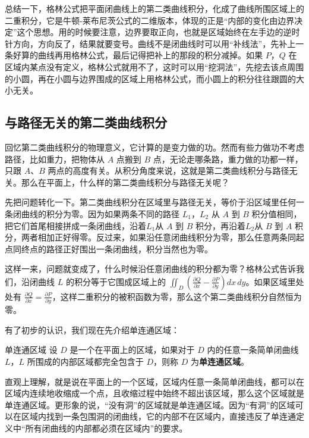 总结一下，格林公式把平面闭曲线上的第二类曲线积分，化成了曲线所围区域上的二重积分，它是牛顿-莱布尼茨公式的二维版本，体现的正是“内部的变化由边界决定”这个思想。用的时候要注意，边界要取正向，也就是区域始终在左手边的逆时针方向，方向反了，结果就要变号。曲线不是闭曲线时可以用“补线法”，先补上一条好算的曲线再用格林公式，最后记得把补上的那段的积分减掉。如果 \(P\)，\(Q\) 在区域内某点没有定义，格林公式就用不了，这时可以用“挖洞法”，先挖去该点周围的小圆，再在小圆与边界围成的区域上用格林公式，而小圆上的积分往往跟圆的大小无关。


\subsection{与路径无关的第二类曲线积分}

回忆第二类曲线积分的物理意义，它计算的是变力做的功。然而有些力做功不考虑路径，比如重力，把物体从 \(A\) 点搬到 \(B\) 点，无论走哪条路，重力做的功都一样，只跟 \(A\)、\(B\) 两点的高度有关。从积分角度来说，这就是第二类曲线积分与路径无关。那么在平面上，什么样的第二类曲线积分与路径无关呢？

先把问题转化一下。第二类曲线积分在区域里与路径无关，等价于沿区域里任何一条闭曲线的积分为零。因为如果两条不同的路径 \(L_1\)，\(L_2\) 从 \(A\) 到 \(B\) 积分值相同，把它们首尾相接拼成一条闭曲线，沿着\(L_1\)从 \(A\) 到 \(B\) 积分，再沿着\(L_2\)从 \(B\) 到 \(A\) 积分，两者相加正好得零。反过来，如果沿任意闭曲线积分为零，那么任意两条同起点同终点的路径正好围出一条闭曲线，积分当然也为零。

这样一来，问题就变成了，什么时候沿任意闭曲线的积分都为零？格林公式告诉我们，沿闭曲线 \(L\) 的积分等于它围成区域上的 \(\iint_D\left(\frac{\partial Q}{\partial x}-\frac{\partial P}{\partial y}\right)dx\,dy\)。如果区域里处处有 \(\frac{\partial Q}{\partial x}=\frac{\partial P}{\partial y}\)，这样二重积分的被积函数为零，那么这个第二类曲线积分自然恒为零。

有了初步的认识，我们现在先介绍单连通区域：
\begin{definition}{单连通区域}{}
    设 $D$ 是一个在平面上的区域，如果对于 $D$ 内的任意一条简单闭曲线 $L$，$L$ 所围成的内部区域都完全包含于 $D$，则称 $D$ 为\textbf{单连通区域}。
\end{definition}

直观上理解，就是说在平面上的一个区域，区域内任意一条简单闭曲线，都可以在区域内连续地收缩成一个点，且收缩过程中始终不超出该区域，那么这个区域就是单连通区域。更形象的说，“没有洞”的区域就是单连通区域。因为“有洞”的区域可以在区域内找到一条包围洞的闭曲线，它的内部不在区域内，直接违反了单连通定义中“所有闭曲线的内部都必须在区域内”的要求。

